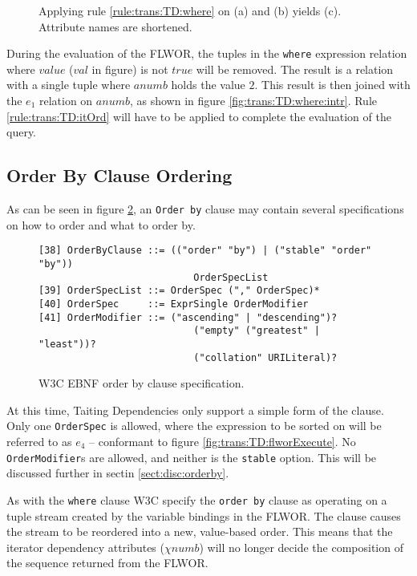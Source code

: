 \begin{myExample}
\begin{figure}[h]
\caption[Example: Evaluation of where clause]{Applying rule \ref{rule:trans:TD:where} on (a) and (b)
yields (c). Attribute names are shortened. \label{fig:trans:TD:whereClause}}
\end{figure}

During the evaluation of the FLWOR, the tuples in the \texttt{where} expression relation where $value$ ($val$ in
figure) is not $true$ will be removed. The result is a relation with a single tuple where $anumb$ holds the value
$2$. This result is then joined with the $e_1$ relation on $anumb$, as shown in figure
\ref{fig:trans:TD:where:intr}. Rule \ref{rule:trans:TD:itOrd} will have to be applied to complete the
evaluation of the query.
\end{myExample}


\subsection{Order By Clause Ordering}

As can be seen in figure \ref{fig:trans:TD:ordEBNF}, an \texttt{Order by} clause may contain several specifications on
how to order and what to order by.
\begin{figure}[h]
\begin{Verbatim}
[38] OrderByClause ::= (("order" "by") | ("stable" "order" "by")) 
                           OrderSpecList
[39] OrderSpecList ::= OrderSpec ("," OrderSpec)*
[40] OrderSpec     ::= ExprSingle OrderModifier
[41] OrderModifier ::= ("ascending" | "descending")? 
                           ("empty" ("greatest" | "least"))? 
                           ("collation" URILiteral)?
\end{Verbatim}
\label{fig:trans:TD:ordEBNF}
\caption[W3C EBNF order by clause specification]{W3C EBNF order by clause specification.}
\end{figure}

At this time, Taiting Dependencies only support a simple form of the clause. Only one \texttt{OrderSpec} is
allowed, where the expression to be sorted on will be referred to as $e_4$ -- conformant to figure
\ref{fig:trans:TD:flworExecute}. No \texttt{OrderModifier}s are allowed, and neither is the \texttt{stable}
option. This will be discussed further in sectin \ref{sect:disc:orderby}.

As with the \texttt{where} clause W3C specify the \texttt{order by} clause as operating on a tuple stream created
by the variable bindings in the FLWOR. The clause causes the stream to be reordered into a new, value-based order.
This means that the iterator dependency attributes ($\chi{numb}$) will no longer decide the composition of the
sequence returned from the FLWOR.

